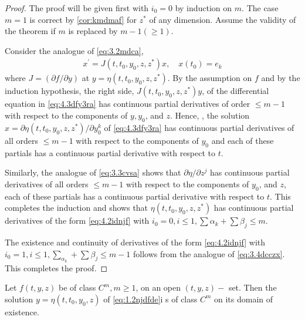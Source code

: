 \documentclass{article}
\begin{document}
\begin{proof}
The proof will be given first with $i_{0}=0$ by induction on $m$. The case $m=1$ is correct by \cref{cor:kmdmaf} for $z^{*}$ of any dimension. Assume the validity of the theorem if $m$ is replaced by $m-1(\ge 1)$. 

Consider the analogue of \cref{eq:3.2mdca},
\begin{align}
x^{\prime}=J\left(t, t_{0}, y_{0}, z, z^{*}\right) x, \quad x\left(t_{0}\right)=e_{k}\label{eq:4.3dfy3ra}
\end{align}
where $J=(\partial f/ \partial y)$ at $y=\eta\left(t, t_{0}, y_{0}, z, z^{*}\right) .$ By the assumption on $f$ and by the induction hypothesis, the right side, $J\left(t, t_{0}, y_{0}, z, z^{*}\right) y$, of the differential equation in \cref{eq:4.3dfy3ra} has continuous partial derivatives of order $\le m-1$ with respect to the components of $y, y_{0}$, and $z$. Hence, , the solution $x=\partial \eta\left(t, t_{0}, y_{0}, z, z^{*}\right) / \partial y_{0}^{k}$ of \cref{eq:4.3dfy3ra} has continuous partial derivatives of all orders $\le m-1$ with respect to the components of $y_{0}$ and each of these partials has a continuous partial derivative with respect to $t$.

Similarly, the analogue of \cref{eq:3.3cvsa} shows that $\partial \eta / \partial z^{j}$ has continuous partial derivatives of all orders $\le m-1$ with respect to the components of $y_{0}$, and $z$, each of these partials has a continuous partial derivative with respect to $t$. This completes the induction and shows that $\eta\left(t, t_{0}, y_{0}, z, z^{*}\right)$ has continuous partial derivatives of the form \cref{eq:4.2idnjf} with $i_{0}=0, i \le 1, \sum \alpha_{k}+\sum \beta_{j} \le m$.

The existence and continuity of derivatives of the form \cref{eq:4.2idnjf} with $i_{0}=1, i \leq 1, \sum_{\alpha_{k}}+\sum \beta_{j} \leq m-1$ follows from the analogue of \cref{eq:3.4dcczx}. This completes the proof.

\end{proof}

\begin{cora}
 Let $f(t, y, z)$ be of class $C^{m}, m \geq 1$, on an open $(t, y, z)-$ set. Then the solution $y=\eta\left(t, t_{0}, y_{0}, z\right)$ of \cref{eq:1.2njdfde}i s of class $C^{m}$ on its domain of existence.
\end{cora} 
\end{document}
